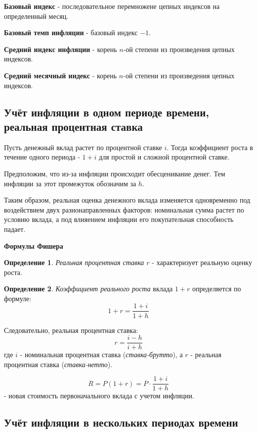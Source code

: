\documentclass[aps,%
12pt,%
final,%
oneside,
onecolumn,%
musixtex, %
superscriptaddress,%
centertags]{article} %
\theoremstyle{plain}
\theoremstyle{definition}
\newtheorem{definition}{Определение}[subsection]
\theoremstyle{remark}
\begin{document}
\textbf{Базовый индекс} - последовательное перемножене цепных индексов на определенный месяц.

\textbf{Базовый темп инфляции} -  базовый индекс $-1$.

\textbf{Средний индекс инфляции} - корень $n$-ой степени из произведения цепных индексов.

\textbf{Средний месячный индекс} - корень $n$-ой степени из произведения цепных индексов.


\subsection{Учёт инфляции в одном периоде времени, реальная процентная ставка}

Пусть денежный вклад растет по процентной ставке $i$. Тогда коэффициент роста в течение одного периода  - $1+i$ для простой и сложной процентной ставке.

Предположим, что из-за инфляции происходит обесценивание денег. Тем инфляции за этот промежуток обозначим за $h$.

Таким образом, реальная оценка денежного вклада изменяется одновременно под воздействием двух разнонаправленных факторов: номинальная сумма растет по условию вклада, а под влияением инфляции его покупательная способность падает.

\textbf{Формулы Фишера}

\begin{definition}
	\textit{Реальная процентная ставка $r$} - характеризует реальную оценку роста.
\end{definition}

\begin{definition}
	\textit{Коэффициент реального роста} вклада $1+r$ определяется по формуле:
	$$1 + r = \frac{1+i}{1+h}$$

	Следовательно, реальная процентная ставка:
	$$r = \frac{i-h}{i+h}$$
	где $i$ - номинальная процентная ставка (\textit{ставка-брутто}), а $r$ - реальная процентная ставка (\textit{ставка-нетто}).
\end{definition}
$$R = P(1+r) = P \cdot \frac{1+i}{1+h}$$ - новая стоимость первоначального вклада с учетом инфляции.


\subsection{Учёт инфляции в нескольких периодах времени}
\end{document}
